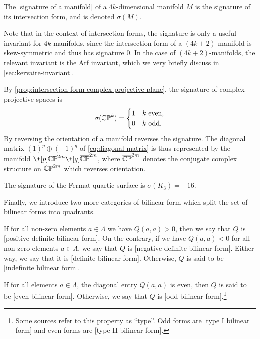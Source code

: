 \begin{definition}
	The [signature of a manifold] of a $4k$-dimensional manifold $M$ is the signature of its intersection form, and is denoted $\sigma(M)$.
\end{definition}

\begin{remark*}
	Note that in the context of intersection forms, the signature is only a useful invariant for $4k$-manifolds, since the intersection form of a $(4k+2)$-manifold is skew-symmetric and thus has signature $0$. In the case of $(4k+2)$-manifolds, the relevant invariant is the Arf invariant, which we very briefly discuss in \cref{sec:kervaire-invariant}.
\end{remark*}

\begin{example}
	By \cref{prop:intersection-form-complex-projective-plane}, the signature of complex projective spaces is
	\[
		\sigma(\mathbb{CP}^k)=\begin{cases}1 & k\textrm{ even},\\ 0 & k\textrm{ odd}.\end{cases}
	\]
	By reversing the orientation of a manifold reverses the signature. The diagonal matrix $(1)^p\oplus (-1)^q$ of \cref{eq:diagonal-matrix} is thus represented by the manifold $\+[p] \CP^{2m} \+[q] \overline{\CP}^{2m}$, where $\overline{\mathbb{CP}}^{2m}$ denotes the conjugate complex structure on $\mathbb{CP}^{2m}$ which reverses orientation.
\end{example}

\begin{example}
	The signature of the Fermat quartic surface is $\sigma(K_3)=-16$.
\end{example}

Finally, we introduce two more categories of bilinear form which split the set of bilinear forms into quadrants.

\begin{definition}
	If for all non-zero elements $a\in \Lambda$ we have $Q(a,a)>0$, then we say that $Q$ is [positive-definite bilinear form]. On the contrary, if we have $Q(a,a)<0$ for all non-zero elements $a\in \Lambda$, we say that $Q$ is [negative-definite bilinear form]. Either way, we say that it is [definite bilinear form]. Otherwise, $Q$ is said to be [indefinite bilinear form].
\end{definition}

\begin{definition}
	If for all elements $a\in \Lambda$, the diagonal entry $Q(a,a)$ is even, then $Q$ is said to be [even bilinear form]. Otherwise, we say that $Q$ is [odd bilinear form].\footnote{Some sources refer to this property as ``type''. Odd forms are [type I bilinear form] and even forms are [type II bilinear form].}
\end{definition}

